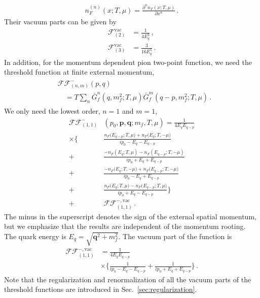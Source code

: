 \documentclass[reprint,english,superscriptaddress,preprintnumbers,amsmath,amssymb,aps,prd]{revtex4-2}
\def\Sec#1{Sec.~\ref{#1}}
\begin{document}
%
\begin{align}
n_F^{(n)}(x;T,\mu)=\frac{\partial^n n_F(x;T,\mu)}{\partial x^n}\,.
\end{align}
%
Their vacuum parts can be given by
%
\begin{align}
\mathcal{F}^{\mathrm{vac}}_{(2)}&=\frac{1}{4E_q^3}\,,\\[2ex]
\mathcal{F}^{\mathrm{vac}}_{(3)}&=\frac{3}{16E_q^5}\,.
\end{align}
%
In addition, for the momentum dependent pion two-point function, we need the threshold function at finite external momentum,
%
\begin{align}
\begin{split}
&\mathcal{FF}^-_{(n,m)}(p,q)\\[2ex]
&\quad= T\sum_n \bar{G}^n_{f}(q,m^2_f;T,\mu)\bar{G}^m_{f}(q-p,m^2_f;T,\mu)\,.
\end{split}
\end{align}
%
We only need the lowest order, $n=1$ and $m=1$,
%
\begin{align}\label{eq:threshold_fun_p}
\mathcal{FF}^-_{(1,1)}&(p_0,\boldsymbol{p},\boldsymbol{q};m_f,T,\mu)=\frac{1}{4E_qE_{q-p}}\nonumber\\[2ex]
\times\Bigg\{&\frac{n_F\big(E_{q-p};T,\mu\big)+n_F\big(E_q;T,-\mu\big)}{i p_0-E_q-E_{q-p}}\nonumber\\[2ex]
+&\frac{-n_F(E_q;T,\mu)-n_F(E_{q-p};T,-\mu)}{i p_0+E_q+E_{q-p}}\nonumber\\[2ex]
+&\frac{-n_F\big(E_q;T,-\mu \big)+n_F\big(E_{q-p};T,-\mu\big)}{i p_0-E_q+E_{q-p}}\nonumber\\[2ex]
+&\frac{n_F\big(E_q;T,\mu\big)-n_F\big(E_{q-p};T,\mu\big)}{i p_0+E_q-E_{q-p}}\Bigg\}\nonumber\\[2ex]
+&\mathcal{FF}^{-,\mathrm{vac}}_{(1,1)}\,.
\end{align}
%
The minus in the superscript denotes the sign of the external spatial momentum, but we emphasize that the results are independent of the momentum rooting. The quark energy is $E_q=\sqrt{\boldsymbol{q}^2+m^2_f}$. The vacuum part of the function is
%
\begin{align}
\mathcal{FF}^{-,\mathrm{vac}}_{(1,1)}&=\frac{1}{4E_qE_{q-p}}\nonumber\\[2ex]
&\times\Bigg\{\frac{1}{ip_0-E_q-E_{q-p}}+\frac{1}{ip_0+E_q+E_{q-p}}\Bigg\}\,.
\end{align}
%
Note that the regularization and renormalization of all the vacuum parts of the threshold functions are introduced in \Sec{sec:regularization}.
\end{document}
